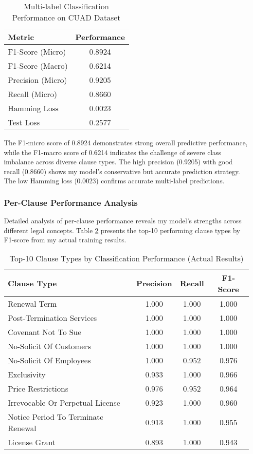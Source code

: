 \begin{table}[ht]
\centering
\caption{Multi-label Classification Performance on CUAD Dataset}
\label{tab:classification_results}
\begin{tabular}{|l|c|}
\hline
\textbf{Metric} & \textbf{Performance} \\
\hline
F1-Score (Micro) & 0.8924 \\
F1-Score (Macro) & 0.6214 \\
Precision (Micro) & 0.9205 \\
Recall (Micro) & 0.8660 \\
Hamming Loss & 0.0023 \\
Test Loss & 0.2577 \\
\hline
\end{tabular}
\end{table}

The F1-micro score of 0.8924 demonstrates strong overall predictive performance, while the F1-macro score of 0.6214 indicates the challenge of severe class imbalance across diverse clause types. The high precision (0.9205) with good recall (0.8660) shows my model's conservative but accurate prediction strategy. The low Hamming loss (0.0023) confirms accurate multi-label predictions.

\subsubsection{Per-Clause Performance Analysis}
Detailed analysis of per-clause performance reveals my model's strengths across different legal concepts. Table \ref{tab:top_clauses} presents the top-10 performing clause types by F1-score from my actual training results.

\begin{table}[ht]
\centering
\caption{Top-10 Clause Types by Classification Performance (Actual Results)}
\label{tab:top_clauses}
\begin{tabular}{|l|c|c|c|}
\hline
\textbf{Clause Type} & \textbf{Precision} & \textbf{Recall} & \textbf{F1-Score} \\
\hline
Renewal Term & 1.000 & 1.000 & 1.000 \\
Post-Termination Services & 1.000 & 1.000 & 1.000 \\
Covenant Not To Sue & 1.000 & 1.000 & 1.000 \\
No-Solicit Of Customers & 1.000 & 1.000 & 1.000 \\
No-Solicit Of Employees & 1.000 & 0.952 & 0.976 \\
Exclusivity & 0.933 & 1.000 & 0.966 \\
Price Restrictions & 0.976 & 0.952 & 0.964 \\
Irrevocable Or Perpetual License & 0.923 & 1.000 & 0.960 \\
Notice Period To Terminate Renewal & 0.913 & 1.000 & 0.955 \\
License Grant & 0.893 & 1.000 & 0.943 \\
\hline
\end{tabular}
\end{table}

